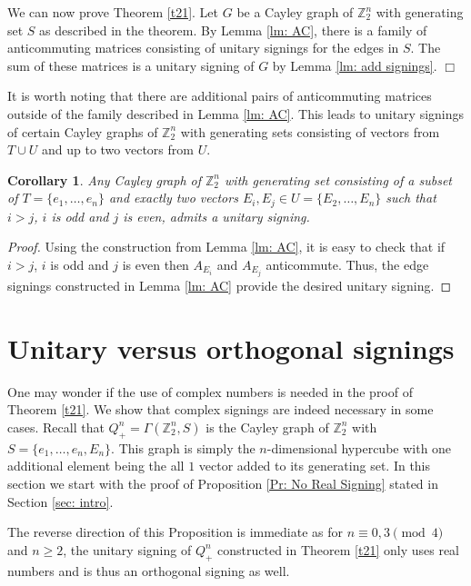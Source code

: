 \documentclass[11pt]{article}
\newtheorem{coro}[theo]{Corollary}
\begin{document}
We can now prove Theorem \ref{t21}. Let $G$ be a 
Cayley graph of ${\mathbb{Z}_{2}^{n}}$ with generating 
set $S$ as described in the theorem.
By Lemma \ref{lm: AC}, there is a family of anticommuting matrices 
consisting of unitary signings for the edges in $S$. The sum of 
these matrices is a unitary signing of $G$ by Lemma \ref{lm: add signings}.
\hfill  $\Box$

It is worth noting that there are additional pairs of anticommuting 
matrices outside of the family described in Lemma \ref{lm: AC}. 
This leads to unitary signings of certain Cayley graphs 
of ${\mathbb{Z}_{2}^{n}}$ with generating sets consisting of vectors 
from $T \cup U$ and up to two vectors from $U$. 

\begin{coro}
Any Cayley graph of ${\mathbb{Z}_{2}^{n}}$ with generating set consisting of a 
subset of $T = \{e_1, \ldots, e_n\}$ and exactly two 
vectors $E_i, E_j \in U = \{E_2, \ldots, E_n \}$ 
such that $i > j$, $i$ is odd and $j$ is even, admits a unitary signing.
\end{coro}
\begin{proof}
Using the construction from 
Lemma \ref{lm: AC}, it is easy to check that if $i > j$, $i$ is odd 
and $j$ is even then $A_{E_i}$ and $A_{E_j}$ anticommute. 
Thus, the edge signings constructed in Lemma \ref{lm: AC} 
provide the desired unitary signing. 
\end{proof}


\section{Unitary versus orthogonal signings} \label{sec: un vs or}

One may wonder if the use of complex numbers is needed in the
proof of Theorem \ref{t21}.
We show that complex signings are indeed necessary in some 
cases.  Recall that 
$Q_{+}^{n} = \Gamma(\mathbb{Z}_{2}^{n}, S)$ is the Cayley graph
of $\mathbb{Z}_{2}^{n}$
with $S = \{e_1, \ldots, e_n, E_n \}$. This graph is simply 
the $n$-dimensional hypercube with one additional element being the
all $1$ vector added 
to its generating set. 
In this section we start with the proof of Proposition 
\ref{Pr: No Real Signing} stated in Section \ref{sec: intro}.
    
The reverse direction of this Proposition 
is immediate as for $n \equiv 0,3 \pmod{4}$ and $n \geq 2$, 
the unitary signing of $Q_+^n$ constructed in Theorem \ref{t21} 
only uses real numbers and is thus an orthogonal signing as well.
\end{document}
